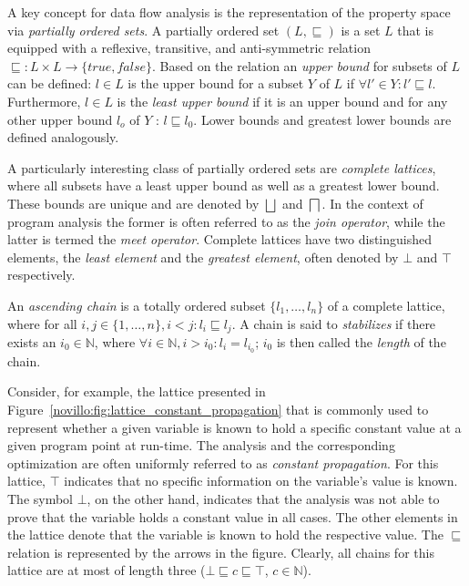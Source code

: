 A key concept for data flow analysis is the representation of the property
space via \emph{partially ordered sets}. A partially ordered set $(L,
\sqsubseteq)$ is a set $L$ that is equipped with a reflexive, transitive, and
anti-symmetric relation $\sqsubseteq: L \times L \rightarrow \{true, false\}$.
Based on the relation an \emph{upper bound} for subsets of $L$ can be defined:
$l \in L$ is the upper bound for a subset $Y$ of $L$ if $\forall l' \in Y: l'
\sqsubseteq l$. Furthermore, $l \in L$ is the \emph{least upper bound} if it is
an upper bound and for any other upper bound $l_o$ of $Y$ : $l \sqsubseteq l_0$.
Lower bounds and greatest lower bounds are defined analogously.

A particularly interesting class of partially ordered sets are \emph{complete
lattices}, where all subsets have a least upper bound as well as a greatest
lower bound. These bounds are unique and are denoted by $\bigsqcup$ and
$\bigsqcap$. In the context of program analysis the former is often referred to
as the \emph{join operator}, while the latter is termed the \emph{meet
operator}. Complete lattices have two distinguished elements, the \emph{least
element} and the \emph{greatest element}, often denoted by $\bot$ and $\top$
respectively.

An \emph{ascending chain} is a totally ordered subset $\{l_1, \ldots, l_n \}$ of
a complete lattice, where for all $i, j \in \{1, \ldots, n\}, i < j: l_i
\sqsubseteq l_j$. A chain is said to \emph{stabilizes} if there exists an $i_0
\in \mathbb{N}$, where $\forall i \in \mathbb{N}, i > i_0: l_i = l_{i_0}$; $i_0$
is then called the \emph{length} of the chain.

Consider, for example, the lattice presented in
Figure~\ref{novillo:fig:lattice_constant_propagation} that is commonly used to
represent whether a given variable is known to hold a specific constant value at
a given program point at run-time. The analysis and the corresponding
optimization are often uniformly referred to as \emph{constant propagation}.
For this lattice, $\top$ indicates that no specific information on the
variable's value is known. The symbol $\bot$, on the other hand, indicates that
the analysis was not able to prove that the variable holds a constant value in
all cases. The other elements in the lattice denote that the variable is known
to hold the respective value. The $\sqsubseteq$ relation is represented by the
arrows in the figure. Clearly, all chains for this lattice are at most of length
three ($\bot \sqsubseteq c \sqsubseteq \top$, $c \in \mathbb{N}$).

